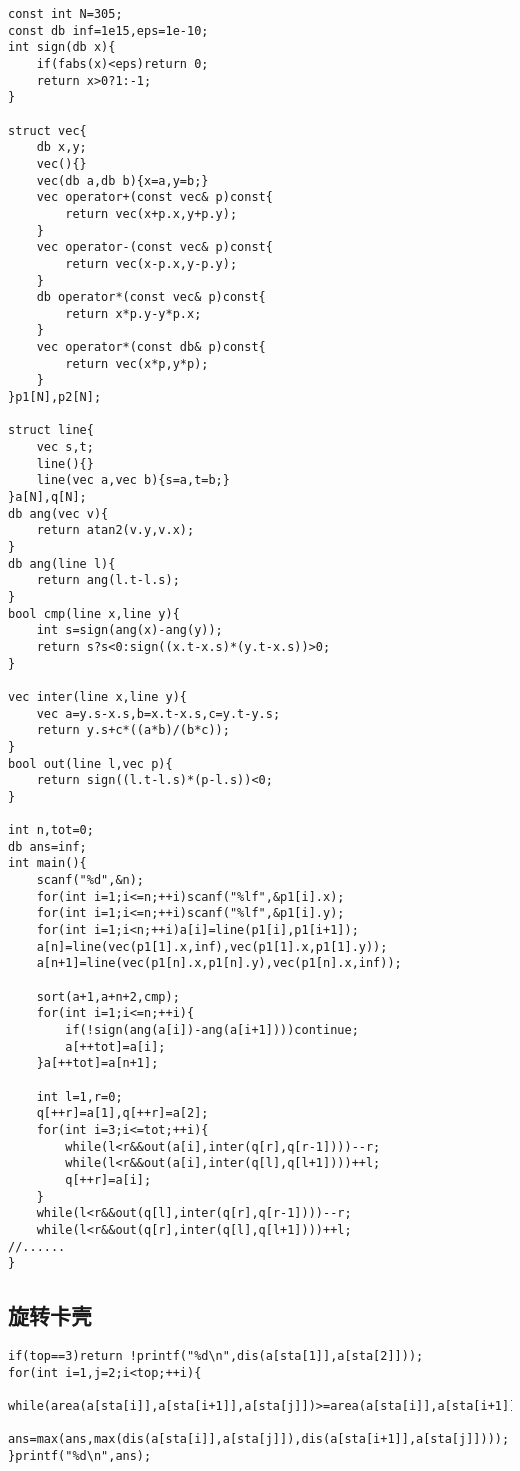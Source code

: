 \documentclass{ctexart}
\begin{document}
\begin{lstlisting}
const int N=305;
const db inf=1e15,eps=1e-10;
int sign(db x){
	if(fabs(x)<eps)return 0;
	return x>0?1:-1;
}

struct vec{
	db x,y;
	vec(){}
	vec(db a,db b){x=a,y=b;}
	vec operator+(const vec& p)const{
		return vec(x+p.x,y+p.y);
	}
	vec operator-(const vec& p)const{
		return vec(x-p.x,y-p.y);
	}
	db operator*(const vec& p)const{
		return x*p.y-y*p.x;
	}
	vec operator*(const db& p)const{
		return vec(x*p,y*p);
	}
}p1[N],p2[N];

struct line{
	vec s,t;
	line(){}
	line(vec a,vec b){s=a,t=b;}
}a[N],q[N];
db ang(vec v){
	return atan2(v.y,v.x);
}
db ang(line l){
	return ang(l.t-l.s);
}
bool cmp(line x,line y){
	int s=sign(ang(x)-ang(y));
	return s?s<0:sign((x.t-x.s)*(y.t-x.s))>0;
}

vec inter(line x,line y){
	vec a=y.s-x.s,b=x.t-x.s,c=y.t-y.s;
	return y.s+c*((a*b)/(b*c));
}
bool out(line l,vec p){
	return sign((l.t-l.s)*(p-l.s))<0;
}

int n,tot=0;
db ans=inf;
int main(){
	scanf("%d",&n);
	for(int i=1;i<=n;++i)scanf("%lf",&p1[i].x);
	for(int i=1;i<=n;++i)scanf("%lf",&p1[i].y);
	for(int i=1;i<n;++i)a[i]=line(p1[i],p1[i+1]);
	a[n]=line(vec(p1[1].x,inf),vec(p1[1].x,p1[1].y));
	a[n+1]=line(vec(p1[n].x,p1[n].y),vec(p1[n].x,inf));
	
	sort(a+1,a+n+2,cmp);
	for(int i=1;i<=n;++i){
		if(!sign(ang(a[i])-ang(a[i+1])))continue;
		a[++tot]=a[i];
	}a[++tot]=a[n+1];
	
	int l=1,r=0;
	q[++r]=a[1],q[++r]=a[2];
	for(int i=3;i<=tot;++i){
		while(l<r&&out(a[i],inter(q[r],q[r-1])))--r;
		while(l<r&&out(a[i],inter(q[l],q[l+1])))++l;
		q[++r]=a[i];
	}
	while(l<r&&out(q[l],inter(q[r],q[r-1])))--r;
	while(l<r&&out(q[r],inter(q[l],q[l+1])))++l;
//......
}
\end{lstlisting}

\subsection{旋转卡壳}

\begin{lstlisting}
if(top==3)return !printf("%d\n",dis(a[sta[1]],a[sta[2]]));
for(int i=1,j=2;i<top;++i){
	while(area(a[sta[i]],a[sta[i+1]],a[sta[j]])>=area(a[sta[i]],a[sta[i+1]],a[sta[j%top+1]]))j=j%top+1;
	ans=max(ans,max(dis(a[sta[i]],a[sta[j]]),dis(a[sta[i+1]],a[sta[j]])));
}printf("%d\n",ans);
\end{lstlisting}
\end{document}
